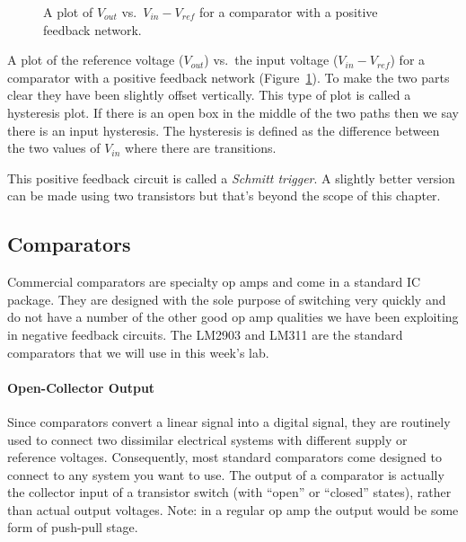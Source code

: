 \documentclass{article}
\begin{document}
\begin{figure}
\begin{center}
\end{center}
\caption{A plot of $V_{out}$ vs.~$V_{in} - V_{ref}$ for a comparator with a positive feedback network.}
\label{fig:hysteresis}
\end{figure}

A plot of the reference voltage ($V_{out}$) vs.~the input voltage ($V_{in} - V_{ref}$) for a comparator with a positive feedback network (Figure~\ref{fig:hysteresis}). To make the two parts clear they have been slightly offset vertically. This type of plot is called a hysteresis plot. If there is an open box in the middle of the two paths then we say there is an input hysteresis. The hysteresis is defined as the difference between the two values of $V_{in}$ where there are transitions. 

This positive feedback circuit is called a \emph{Schmitt trigger}. A slightly better version can be made using two transistors but that's beyond the scope of this chapter.

\subsection{Comparators}
Commercial comparators are specialty op amps and come in a standard IC package. They are designed with the sole purpose of switching very quickly and do not have a number of the other good op amp qualities we have been exploiting in negative feedback circuits. The LM2903 and LM311 are the standard comparators that we will use in this week's lab.

\paragraph{Open-Collector Output}
Since comparators convert a linear signal into a digital signal, they are routinely used to connect two dissimilar electrical systems with different supply or reference voltages. Consequently, most standard comparators come designed to connect to any system you want to use. The output of a comparator is actually the collector input of a transistor switch (with ``open'' or ``closed'' states), rather than actual output voltages.  Note: in a regular op amp the output would be some form of push-pull stage.
\end{document}
